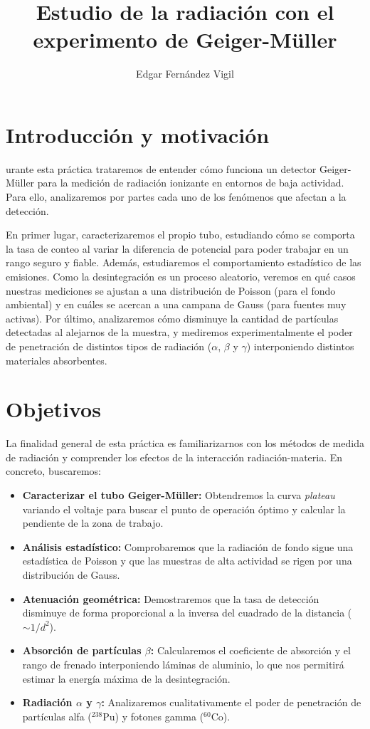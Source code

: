 \documentclass[9pt,a4paper,twocolumn,twoside]{rho-class/rho}
\title{Estudio de la radiación con el experimento de Geiger-Müller}
\author{Edgar Fernández Vigil}
\affil{Física - Facultad de Ciencias - Universidad de Oviedo}
\begin{document}
    \maketitle
    \thispagestyle{firststyle}

\section{Introducción y motivación}

urante esta práctica trataremos de entender cómo funciona un detector Geiger-Müller para la medición de radiación ionizante en entornos de baja actividad. Para ello, analizaremos por partes cada uno de los fenómenos que afectan a la detección. 

En primer lugar, caracterizaremos el propio tubo, estudiando cómo se comporta la tasa de conteo al variar la diferencia de potencial para poder trabajar en un rango seguro y fiable. Además, estudiaremos el comportamiento estadístico de las emisiones. Como la desintegración es un proceso aleatorio, veremos en qué casos nuestras mediciones se ajustan a una distribución de Poisson (para el fondo ambiental) y en cuáles se acercan a una campana de Gauss (para fuentes muy activas). Por último, analizaremos cómo disminuye la cantidad de partículas detectadas al alejarnos de la muestra, y mediremos experimentalmente el poder de penetración de distintos tipos de radiación ($\alpha$, $\beta$ y $\gamma$) interponiendo distintos materiales absorbentes.

\section{Objetivos}

La finalidad general de esta práctica es familiarizarnos con los métodos de medida de radiación y comprender los efectos de la interacción radiación-materia. En concreto, buscaremos:

\begin{itemize}
    \item \textbf{Caracterizar el tubo Geiger-Müller:} Obtendremos la curva \textit{plateau} variando el voltaje para buscar el punto de operación óptimo y calcular la pendiente de la zona de trabajo.
    \item \textbf{Análisis estadístico:} Comprobaremos que la radiación de fondo sigue una estadística de Poisson y que las muestras de alta actividad se rigen por una distribución de Gauss.
    \item \textbf{Atenuación geométrica:} Demostraremos que la tasa de detección disminuye de forma proporcional a la inversa del cuadrado de la distancia ($\sim 1/d^2$).
    \item \textbf{Absorción de partículas $\beta$:} Calcularemos el coeficiente de absorción y el rango de frenado interponiendo láminas de aluminio, lo que nos permitirá estimar la energía máxima de la desintegración.
    \item \textbf{Radiación $\alpha$ y $\gamma$:} Analizaremos cualitativamente el poder de penetración de partículas alfa ($^{238}\text{Pu}$) y fotones gamma ($^{60}\text{Co}$).
\end{itemize}
\end{document}
